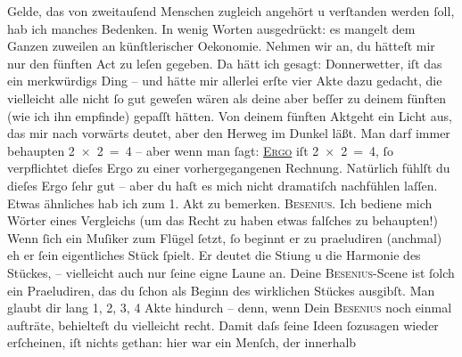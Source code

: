 \begin{ledgroupsized}[t]{13cm}
                  Gelde, das von zweitauſend Menschen zugleich angehört u verſtanden werden
               ſoll, hab ich manches Bedenken. In wenig Worten ausgedrückt: {\pb}es mangelt dem Ganzen
               zuweilen an künſtlerischer Oekonomie. Nehmen wir an, du hätteſt mir nur den fünften
               Act zu leſen gegeben. Da hätt ich gesagt: Donnerwetter, iſt das ein merkwürdigs Ding
               – und hätte mir allerlei erſte vier Akte dazu gedacht, die vielleicht alle nicht ſo
               gut geweſen wären als deine  aber beſſer zu deinem fünften (wie ich ihn empfinde) gepaſſt hätten.
               Von deinem fünften Aktgeht ein Licht aus,
               das mir nach vorwärts deutet, aber den Herweg im Dunkel läßt. Man darf immer
               behaupten 2 × 2 = 4 – aber wenn man ſagt: \textsc{\uline{Ergo}} iſt 2 × 2 = 4, ſo verpflichtet dieſes Ergo zu einer vorhergegangenen Rechnung.
               Natürlich fühlſt du dieſes Ergo ſehr gut – aber du haſt es mich nicht dramatiſch
               nachfühlen laſſen. Etwas ähnliches hab ich zum 1. Akt zu bemerken. \textsc{Besenius}. {\pb}Ich bediene
               mich Wörter eines Vergleichs (um das Recht zu haben etwas falſches zu behaupten!)
               Wenn ſich ein Muſiker zum Flügel ſetzt, ſo beginnt er zu praeludiren (anchmal) eh er ſein eigentliches Stück ſpielt. Er deutet die Sti{\geminationm}ung u die Harmonie des Stückes, – vielleicht auch nur
               ſeine eigne Laune an. Deine \textsc{Besenius}-Scene ist ſolch ein Praeludiren, das du ſchon als Beginn des wirklichen Stückes
               ausgibſt. Man {\pb}glaubt
               dir lang {\dotstwo} 1, 2, 3, 4 Akte hindurch – denn, wenn Dein \textsc{Besenius} noch einmal aufträte, behielteſt du vielleicht recht. Damit daſs ſeine Ideen
               ſozusagen wieder erſcheinen, iſt nichts gethan: hier war ein Menſch, der innerhalb

\end{ledgroupsized}
